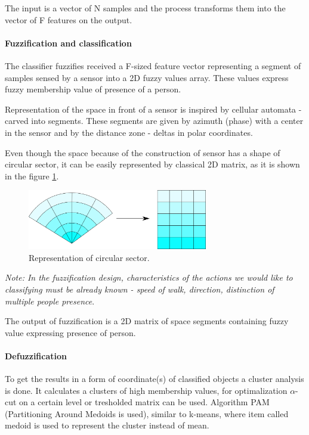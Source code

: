 The input is a vector of N samples and the process transforms them into the vector of
F features on the output.

\paragraph{Fuzzification and classification}
The classifier fuzzifies received a F-sized feature vector representing a segment of samples sensed by a sensor
into a 2D fuzzy values array. These values express fuzzy membership value of presence of a person.

Representation of the space in front of a sensor is inspired by cellular automata - carved into
segments. These segments are given by azimuth (phase) with a center in the sensor and by
the distance zone - deltas in polar coordinates.

Even though the space because of the construction of sensor has a shape of circular sector,
it can be easily represented by classical 2D matrix, as it is shown in the figure \ref{fig:circularsector}.

\begin{figure}[h!]
\begin{center}
\includegraphics[width=0.7\textwidth]{obrazky-figures/circularsector_transformation.png}
\caption{Representation of circular sector.\label{fig:circularsector}}
\end{center}
\end{figure}

{\it Note: In the fuzzification design, characteristics of the actions we would like to classifying
must be already known - speed of walk, direction, distinction of multiple people presence}.

The output of fuzzification is a 2D matrix of space segments containing fuzzy value expressing
presence of person.

\paragraph{Defuzzification}

To get the results in a form of coordinate(s) of classified objects a cluster analysis is done. It calculates
a clusters of high membership values, for optimalization $\alpha$-cut on a certain level or tresholded
matrix can be used. Algorithm PAM (Partitioning Around Medoids is used), similar to k-means, where item called
medoid is used to represent the cluster instead of mean.

